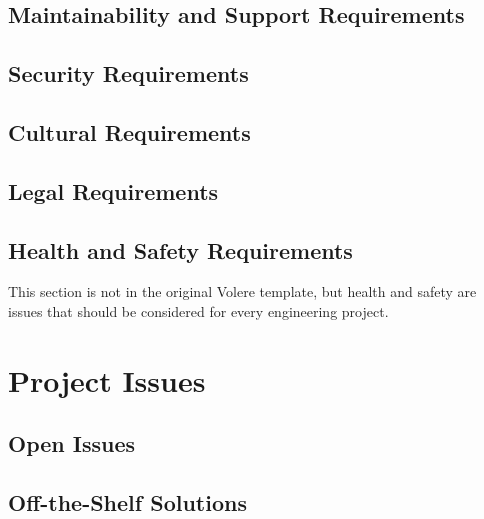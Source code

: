\documentclass[12pt, titlepage]{article}
\begin{document}
\subsection{Maintainability and Support Requirements}

\subsection{Security Requirements}

\subsection{Cultural Requirements}

\subsection{Legal Requirements}

\subsection{Health and Safety Requirements}
This section is not in the original Volere template, but health and safety are
issues that should be considered for every engineering project.

\section{Project Issues}

\subsection{Open Issues}

\subsection{Off-the-Shelf Solutions}
\end{document}
